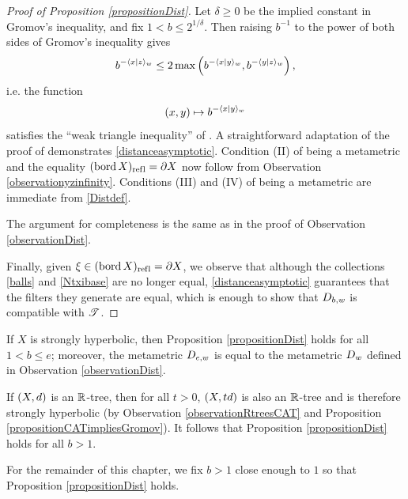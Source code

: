\begin{proof}[Proof of Proposition \ref{propositionDist}]
Let $\delta \geq 0$ be the implied constant in Gromov's inequality, and fix $1 < b \leq 2^{1/\delta}$. Then raising $b^{-1}$ to the power of both sides of Gromov's inequality gives
\[
b^{-\langle x|z\rangle_w} \leq 2\max\left(b^{-\langle x|y\rangle_w}, b^{-\langle y|z\rangle_w}\right),
\]
i.e. the function
\[
(x,y)\mapsto b^{-\langle x|y\rangle_w}
\]
satisfies the ``weak triangle inequality'' of \cite{Schroeder}. A straightforward adaptation of the proof of \cite[Theorem 1.2]{Schroeder} demonstrates \eqref{distanceasymptotic}. Condition (II) of being a metametric and the equality $(\operatorname{bord} X)_{\mathrm{ref \hspace{0 in} l}} = \partial X$ now follow from Observation \ref{observationyzinfinity}. Conditions (III) and (IV) of being a metametric are immediate from \eqref{Distdef}.

The argument for completeness is the same as in the proof of Observation \ref{observationDist}.

Finally, given $\xi\in (\operatorname{bord} X)_{\mathrm{ref \hspace{0 in} l}} = \partial X$, we observe that although the collections \eqref{balls} and \eqref{Ntxibase} are no longer equal, \eqref{distanceasymptotic} guarantees that the filters they generate are equal, which is enough to show that $D_{b,w}$ is compatible with $\mathscr T$.
\end{proof}

\begin{remark}
\label{remarkDist}
If $X$ is strongly hyperbolic, then Proposition \ref{propositionDist} holds for all $1 < b\leq e$; moreover, the metametric $D_{e,w}$ is equal to the metametric $D_w$ defined in Observation \ref{observationDist}.
\end{remark}

\begin{remark}
\label{remarkDistRtree}
If $(X,d)$ is an $\R$-tree, then for all $t > 0$, $(X,td)$ is also an $\R$-tree and is therefore strongly hyperbolic (by Observation \ref{observationRtreesCAT} and Proposition \ref{propositionCATimpliesGromov}). It follows that Proposition \ref{propositionDist} holds for all $b > 1$.
\end{remark}


For the remainder of this chapter, we fix $b > 1$ close enough to $1$ so that Proposition \ref{propositionDist} holds.

